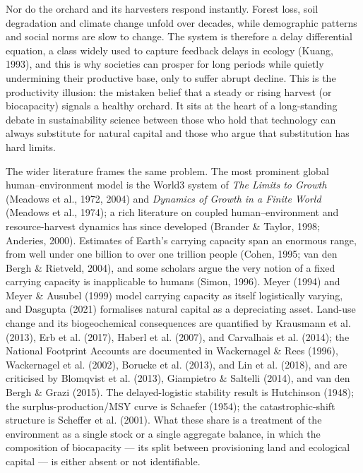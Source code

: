 \documentclass[11pt]{article}
\begin{document}
Nor do the orchard and its harvesters respond instantly. Forest loss, soil degradation and climate change unfold over decades, while demographic patterns and social norms are slow to change. The system is therefore a delay differential equation, a class widely used to capture feedback delays in ecology (Kuang, 1993), and this is why societies can prosper for long periods while quietly undermining their productive base, only to suffer abrupt decline. This is the productivity illusion: the mistaken belief that a steady or rising harvest (or biocapacity) signals a healthy orchard. It sits at the heart of a long-standing debate in sustainability science between those who hold that technology can always substitute for natural capital and those who argue that substitution has hard limits.

The wider literature frames the same problem. The most prominent global human--environment model is the World3 system of \emph{The Limits to Growth} (Meadows et al., 1972, 2004) and \emph{Dynamics of Growth in a Finite World} (Meadows et al., 1974); a rich literature on coupled human--environment and resource-harvest dynamics has since developed (Brander \& Taylor, 1998; Anderies, 2000). Estimates of Earth's carrying capacity span an enormous range, from well under one billion to over one trillion people (Cohen, 1995; van den Bergh \& Rietveld, 2004), and some scholars argue the very notion of a fixed carrying capacity is inapplicable to humans (Simon, 1996). Meyer (1994) and Meyer \& Ausubel (1999) model carrying capacity as itself logistically varying, and Dasgupta (2021) formalises natural capital as a depreciating asset. Land-use change and its biogeochemical consequences are quantified by Krausmann et al. (2013), Erb et al. (2017), Haberl et al. (2007), and Carvalhais et al. (2014); the National Footprint Accounts are documented in Wackernagel \& Rees (1996), Wackernagel et al. (2002), Borucke et al. (2013), and Lin et al. (2018), and are criticised by Blomqvist et al. (2013), Giampietro \& Saltelli (2014), and van den Bergh \& Grazi (2015). The delayed-logistic stability result is Hutchinson (1948); the surplus-production/MSY curve is Schaefer (1954); the catastrophic-shift structure is Scheffer et al. (2001). What these share is a treatment of the environment as a single stock or a single aggregate balance, in which the composition of biocapacity --- its split between provisioning land and ecological capital --- is either absent or not identifiable.
\end{document}
